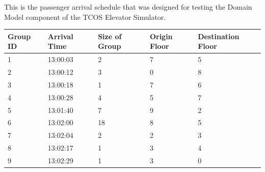 \documentclass{UoYCSproject}
\begin{document}
This is the passenger arrival schedule that was designed for testing the Domain Model component of the TCOS Elevator Simulator.

\begin{tabular}{l | l | l | l | l}
	Group ID & Arrival Time & Size of Group & Origin Floor & Destination Floor \\
	\hline
	1 & 13:00:03 & 2 & 7 & 5 \\
	2 & 13:00:12 & 3 & 0 & 8 \\
	3 & 13:00:18 & 1 & 7 & 6 \\
	4 & 13:00:28 & 4 & 5 & 7 \\
	5 & 13:01:40 & 7 & 9 & 2 \\
	6 & 13:02:00 & 18 & 8 & 5 \\
	7 & 13:02:04 & 2 & 2 & 3 \\
	8 & 13:02:17 & 1 & 3 & 4 \\
	9 & 13:02:29 & 1 & 3 & 0
\end{tabular}
\end{document}

